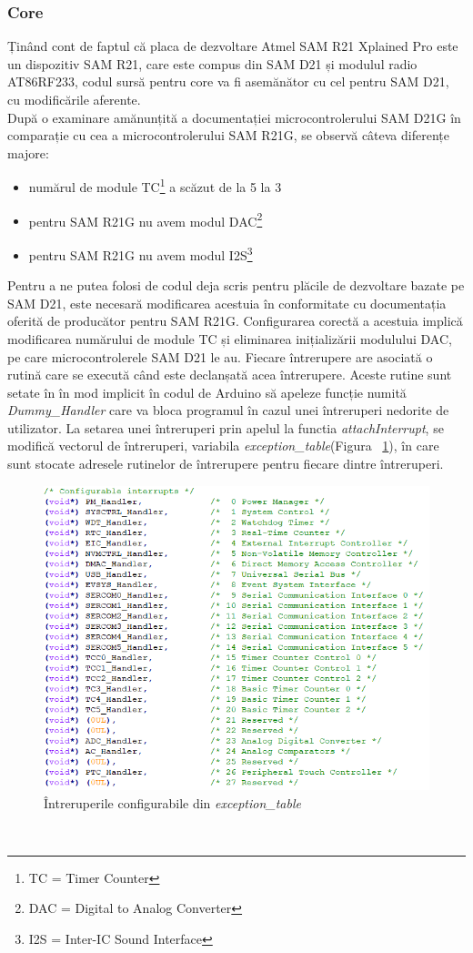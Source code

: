 \documentclass[12pt,a4paper]{report}
\begin{document}
\subsubsection{Core}
Ținând cont de faptul că placa de dezvoltare Atmel SAM R21 Xplained Pro este un dispozitiv SAM R21,  care este compus din SAM D21 și modulul radio AT86RF233, codul sursă pentru core va fi asemănător cu cel pentru SAM D21, cu modificările aferente. \\
După o examinare amănunțită a documentației microcontrolerului SAM D21G în comparație cu cea a microcontrolerului SAM R21G, se observă câteva diferențe majore:
\begin{itemize}
	\item{numărul de module TC\footnote{TC = Timer Counter} a scăzut de la 5 la 3}
	\item{pentru SAM R21G nu avem modul DAC\footnote{DAC = Digital to Analog Converter}}
	\item{pentru SAM R21G nu avem modul I2S\footnote{I2S = Inter-IC Sound Interface}}
\end{itemize}
Pentru a ne putea folosi de codul deja scris pentru plăcile de dezvoltare bazate pe SAM D21, este necesară modificarea acestuia în conformitate cu documentația oferită de producător pentru SAM R21G. Configurarea corectă a acestuia implică modificarea numărului de module TC și eliminarea inițializării modulului DAC, pe care microcontrolerele SAM D21 le au.
Fiecare întrerupere are asociată o rutină care se execută când este declanșată acea întrerupere. Aceste rutine sunt setate în în mod implicit în codul de Arduino să apeleze funcție numită \textit{Dummy\_Handler} care va bloca programul în cazul unei întreruperi nedorite de utilizator. La setarea unei întreruperi prin apelul la functia \textit{attachInterrupt}, se modifică vectorul de întreruperi, variabila \textit{exception\_table}(Figura ~\ref{fig:interrupts}), în care sunt stocate adresele rutinelor de întrerupere pentru fiecare dintre întreruperi. 
\begin{figure}[h]
\centering
\includegraphics[scale=0.6]{pics/interrupt_vector.png}
  \caption{Întreruperile configurabile din \textit{exception\_table}}
  \label{fig:interrupts}
\end{figure}\\
\end{document}
